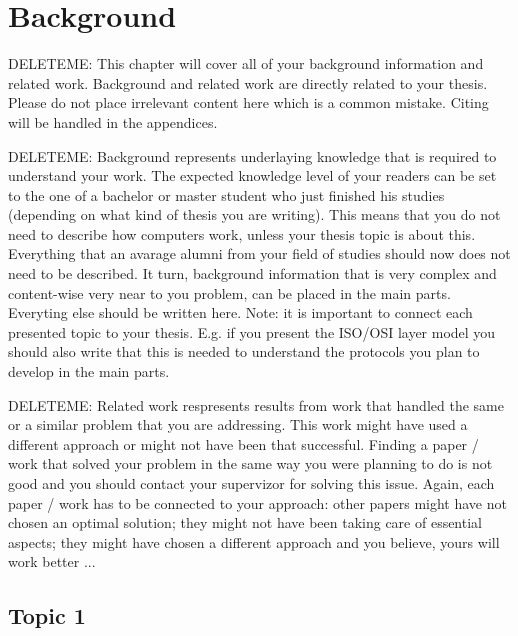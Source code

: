 \chapter{Background}
\label{background}

DELETEME: This chapter will cover all of your background information and related work. Background and related work are directly related to your thesis. Please do not place irrelevant content here which is a common mistake. Citing will be handled in the appendices.

DELETEME: Background represents underlaying knowledge that is required to understand your work. The expected knowledge level of your readers can be set to the one of a bachelor or master student who just finished his studies (depending on what kind of thesis you are writing). This means that you do not need to describe how computers work, unless your thesis topic is about this. Everything that an avarage alumni from your field of studies should now does not need to be described. It turn, background information that is very complex and content-wise very near to you problem, can be placed in the main parts. Everyting else should be written here. Note: it is important to connect each presented topic to your thesis. E.g. if you present the ISO/OSI layer model you should also write that this is needed to understand the protocols you plan to develop in the main parts.

DELETEME: Related work respresents results from work that handled the same or a similar problem that you are addressing. This work might have used a different approach or might not have been that successful. Finding a paper / work that solved your problem in the same way you were planning to do is not good and you should contact your supervizor for solving this issue. Again, each paper / work has to be connected to your approach: other papers might have not chosen an optimal solution; they might not have been taking care of essential aspects; they might have chosen a different approach and you believe, yours will work better ...

\section{Topic 1}

